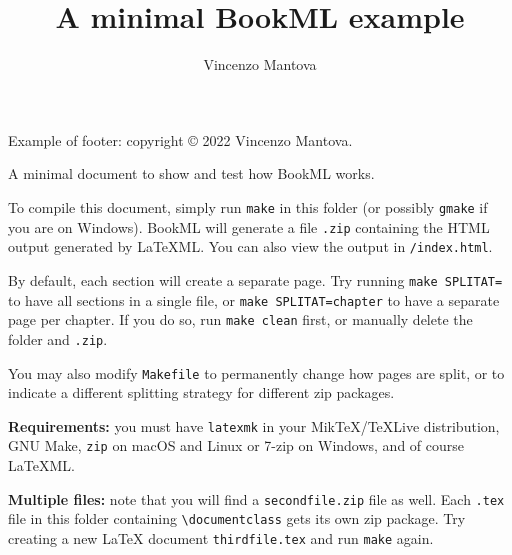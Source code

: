 \documentclass{book}
\title{A minimal BookML example}
\author{Vincenzo Mantova}
\newenvironment{abstract}{}{}
\begin{document}
\begin{lxFooter}
  Example of footer: copyright \copyright{} 2022 Vincenzo Mantova.
\end{lxFooter}

\begin{abstract}
  A minimal document to show and test how BookML works.
\end{abstract}

To compile this document, simply run \texttt{make} in this folder (or possibly \texttt{gmake} if you are on Windows). BookML will generate a file \texttt{\jobname.zip} containing the HTML output generated by LaTeXML. You can also view the output in \texttt{\jobname/index.html}.

By default, each section will create a separate page. Try running \texttt{make SPLITAT=} to have all sections in a single file, or \texttt{make SPLITAT=chapter} to have a separate page per chapter. If you do so, run \texttt{make clean} first, or manually delete the folder \texttt{\jobname} and \texttt{\jobname.zip}.

You may also modify \texttt{Makefile} to permanently change how pages are split, or to indicate a different splitting strategy for different zip packages.

\textbf{Requirements:} you must have \texttt{latexmk} in your MikTeX/TeXLive distribution, GNU Make, \texttt{zip} on macOS and Linux or 7-zip on Windows, and of course LaTeXML.

\textbf{Multiple files:} note that you will find a \texttt{secondfile.zip} file as well. Each \texttt{.tex} file in this folder containing \texttt{\textbackslash{}documentclass} gets its own zip package. Try creating a new \LaTeX{} document \texttt{thirdfile.tex} and run \texttt{make} again.


\end{document}
